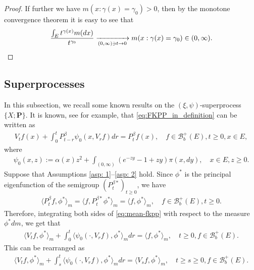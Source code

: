 \documentclass[12pt,a4paper]{amsart}
\theoremstyle{definition}
\numberwithin{equation}{section}
\begin{document}
\begin{proof}
	If further
	we have $m(x:\gamma(x) = \gamma_0)>0$, then by the monotone convergence theorem  it is easy to see that
  \begin{equation}
    \frac{\int_E t^{\gamma(x)} m(dx)}{t^{\gamma_0}}
    \xrightarrow[(0,\infty)\ni t\to 0]{} m(x:\gamma(x) = \gamma_0)\in (0,\infty).
    \qedhere
  \end{equation}
\end{proof}

\subsection{Superprocesses} \label{sec: Superprocesses}
In this subsection, we recall some known results on the $(\xi, \psi)$-superprocess $\{X; \mathbf P\}$.
It is known, see \cite[Theorem 2.23]{Li2011Measure-valued} for example, that \eqref{eq:FKPP_in_definition} can be written as
\begin{align}\label{eq:mean-fkpp}
	V_t f(x) + \int_0^t P^\beta_{t-r} \psi_0(x,V_r f) dr
	= P^\beta_t f(x),
	\quad f \in \mathscr B^+_b(E), t \geq 0,x \in E,
\end{align}
where
\begin{align}
	\psi_0(x,z)
	:= \alpha(x) z^2 + \int_{(0,\infty)} (e^{-z y} - 1 + z y) \pi(x,dy),
	\quad x \in E,z \geq 0.
\end{align}
Suppose that Assumptions \ref{asp: 1}--\ref{asp: 2} hold.
Since $\phi^*$ is the principal eigenfunction of the semigroup $(P_t^{\beta*})_{t\geq 0}$, we have
\begin{align}
  \langle P^\beta_{t} f, \phi^* \rangle_m
  = \langle f, P^{\beta*}_{t}\phi^* \rangle_m
  = \langle f, \phi^* \rangle_m,
  \quad f\in \mathscr B^+_b(E), t\geq 0.
\end{align}
Therefore, integrating both sides of \eqref{eq:mean-fkpp} with respect to the measure 
$\phi^*dm$, we get that
\begin{align}
  \langle V_tf,\phi^*\rangle_m + \int_0^t \langle \psi_0(\cdot ,V_r f) , \phi^*\rangle_mdr
  = \langle f,\phi^*\rangle_m,
  \quad t\geq 0, f\in \mathscr B^+_b(E).
\end{align}
This can be rearranged as
\begin{align}\label{eq:langleVtfphiranglem_equation}
  \langle V_tf,\phi^*\rangle_m + \int_s^t \langle \psi_0(\cdot ,V_r f) , \phi^*\rangle_mdr
  = \langle V_sf,\phi^*\rangle_m,
  \quad t\geq s\geq 0, f\in \mathscr B^+_b(E).
\end{align}
\end{document}
